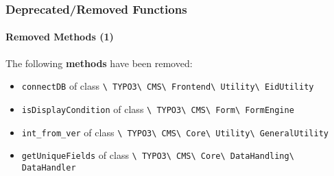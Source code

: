 \begin{frame}[fragile]
	\frametitle{Deprecated/Removed Functions}
	\framesubtitle{Removed Methods (1)}

	The following \textbf{methods} have been removed:

	\begin{itemize}
		\item
			\small
				\texttt{connectDB}\newline
				of class
				\texttt{\textbackslash
					TYPO3\textbackslash
					CMS\textbackslash
					Frontend\textbackslash
					Utility\textbackslash
					EidUtility}
			\normalsize
		\item
			\small
				\texttt{isDisplayCondition}\newline
				of class
				\texttt{\textbackslash
					TYPO3\textbackslash
					CMS\textbackslash
					Form\textbackslash
					FormEngine}
			\normalsize
		\item
			\small
				\texttt{int\_from\_ver}\newline
				of class
				\texttt{\textbackslash
					TYPO3\textbackslash
					CMS\textbackslash
					Core\textbackslash
					Utility\textbackslash
					GeneralUtility}
			\normalsize
		\item
			\small
				\texttt{getUniqueFields}\newline
				of class
				\texttt{\textbackslash
					TYPO3\textbackslash
					CMS\textbackslash
					Core\textbackslash
					DataHandling\textbackslash
					DataHandler}
			\normalsize

	\end{itemize}

\end{frame}


